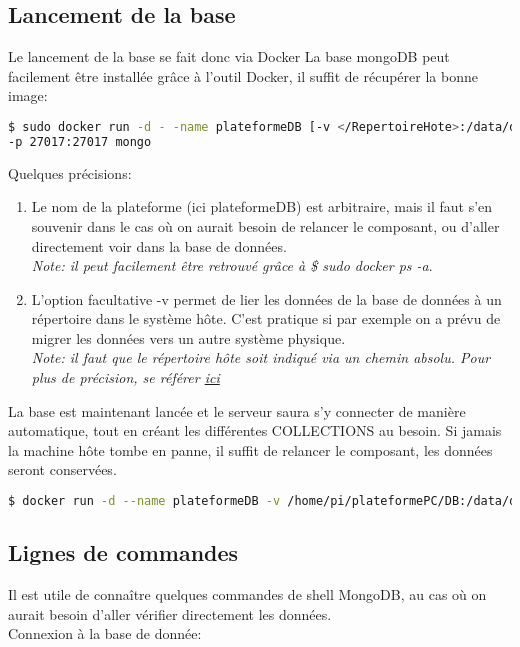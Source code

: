 \documentclass[a4paper]{article}
\begin{document}
\subsection{Lancement de la base}
Le lancement de la base se fait donc via Docker
La base mongoDB peut facilement être installée grâce à l'outil Docker, il suffit de récupérer la bonne image:
\begin{lstlisting}[language=bash]
$ sudo docker run -d - -name plateformeDB [-v </RepertoireHote>:/data/db] 
-p 27017:27017 mongo
\end{lstlisting}
Quelques précisions:
\begin{enumerate}
\item Le nom de la plateforme (ici plateformeDB) est arbitraire, mais il faut s'en souvenir dans le cas où on aurait besoin de relancer le composant, ou d'aller directement voir dans la base de données. \\
\textit{Note: il peut facilement être retrouvé grâce à \$ sudo docker ps -a}.
\item L'option facultative -v permet de lier les données de la base de données à un répertoire dans le système hôte. C'est pratique si par exemple on a prévu de migrer les données vers un autre système physique.\\
\textit{Note: il faut que le répertoire hôte soit indiqué via un chemin absolu. Pour plus de précision, se référer \href{https://docs.docker.com/engine/reference/commandline/run/\#/mount-volume--v---read-only}{ici}}
\end{enumerate}
La base est maintenant lancée et le serveur saura s'y connecter de manière automatique, tout en créant les différentes COLLECTIONS au besoin. Si jamais la machine hôte tombe en panne, il suffit de relancer le composant, les données seront conservées.
\begin{lstlisting}[language=bash]
  $ docker run -d --name plateformeDB -v /home/pi/plateformePC/DB:/data/db -p 27017:27017 descol/rpi-mongo
\end{lstlisting}
\subsection{Lignes de commandes}
Il est utile de connaître quelques commandes de shell MongoDB, au cas où on aurait besoin d'aller vérifier directement les données.\\
Connexion à la base de donnée:
\end{document}
